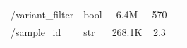 \documentclass[a4paper,num-refs]{oup-contemporary}
\begin{document}
\begin{table}
\begin{tabular}{llS[table-format=3.1]S[table-format=3.2]S[table-format=3.2]}
/variant\_filter & bool & 6.4M & 570 & \\
/sample\_id & str & 268.1K & 2.3 & \\

\end{tabular}
\end{table}
\end{document}
